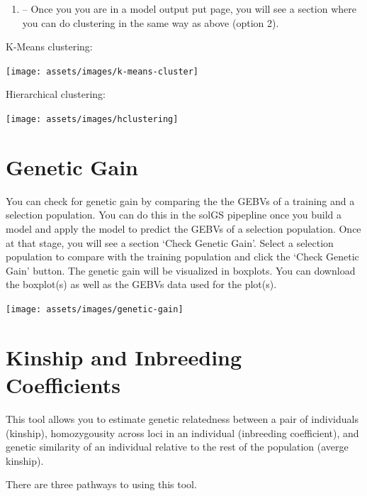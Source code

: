 \documentclass[
  12pt,
]{book}
\providecommand{\tightlist}{%
  \setlength{\itemsep}{0pt}\setlength{\parskip}{0pt}}
\begin{document}
\begin{enumerate}
\def\labelenumi{(\Alph{enumi})}
\tightlist
\item
  -- Once you you are in a model output put page, you will see a section where you can do clustering in the same way as above (option 2).
\end{enumerate}

K-Means clustering:

\begin{center}\texttt{[image: assets/images/k-means-cluster]} \end{center}

Hierarchical clustering:

\begin{center}\texttt{[image: assets/images/hclustering]} \end{center}

\hypertarget{genetic-gain}{%
\section{Genetic Gain}\label{genetic-gain}}

You can check for genetic gain by comparing the the GEBVs of a training and a selection population. You can do this in the solGS pipepline once you build a model and apply the model to predict the GEBVs of a selection population. Once at that stage, you will see a section `Check Genetic Gain'. Select a selection population to compare with the training population and click the `Check Genetic Gain' button. The genetic gain will be visualized in boxplots. You can download the boxplot(s) as well as the GEBVs data used for the plot(s).

\begin{center}\texttt{[image: assets/images/genetic-gain]} \end{center}

\hypertarget{kinship-and-inbreeding-coefficients}{%
\section{Kinship and Inbreeding Coefficients}\label{kinship-and-inbreeding-coefficients}}

This tool allows you to estimate genetic relatedness between a pair of individuals (kinship), homozygousity across loci in an individual (inbreeding coefficient), and genetic similarity of an individual relative to the rest of the population (averge kinship).

There are three pathways to using this tool.
\end{document}

